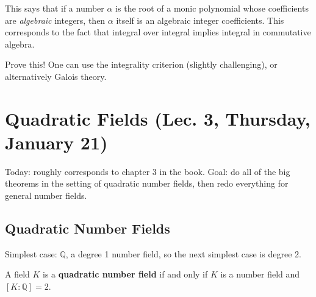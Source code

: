 \begin{remark}

This says that if a number \(\alpha\) is the root of a monic polynomial
whose coefficients are \emph{algebraic} integers, then \(\alpha\) itself
is an algebraic integer coefficients. This corresponds to the fact that
integral over integral implies integral in commutative algebra.

\end{remark}

\begin{exercise}

Prove this! One can use the integrality criterion (slightly
challenging), or alternatively Galois theory.

\end{exercise}

\hypertarget{quadratic-fields-lec.-3-thursday-january-21}{%
\section{Quadratic Fields (Lec. 3, Thursday, January
21)}\label{quadratic-fields-lec.-3-thursday-january-21}}

\begin{remark}

Today: roughly corresponds to chapter 3 in the book. Goal: do all of the
big theorems in the setting of quadratic number fields, then redo
everything for general number fields.

\end{remark}

\hypertarget{quadratic-number-fields}{%
\subsection{Quadratic Number Fields}\label{quadratic-number-fields}}

\begin{remark}

Simplest case: \({\mathbb{Q}}\), a degree 1 number field, so the next
simplest case is degree 2.

\end{remark}

\begin{definition}

A field \(K\) is a \textbf{quadratic number field} if and only if \(K\)
is a number field and \([K: {\mathbb{Q}}] = 2\).

\end{definition}

